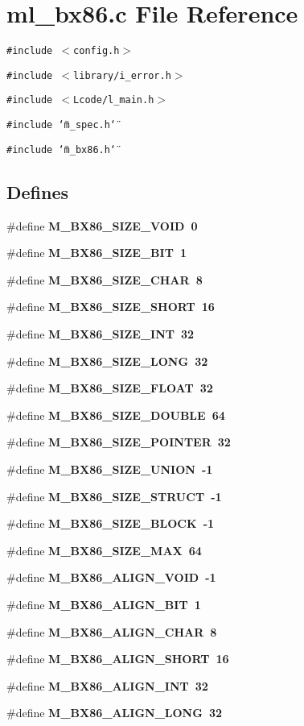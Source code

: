 \section{ml\_\-bx86.c File Reference}
\label{ml__bx86_8c}
{\tt \#include $<$config.h$>$}\par
{\tt \#include $<$library/i\_\-error.h$>$}\par
{\tt \#include $<$Lcode/l\_\-main.h$>$}\par
{\tt \#include \char`\"{}m\_\-spec.h\char`\"{}}\par
{\tt \#include \char`\"{}m\_\-bx86.h\char`\"{}}\par
\subsection*{Defines}
\begin{CompactItemize}
\item 
\#define \bf{M\_\-BX86\_\-SIZE\_\-VOID}~0
\item 
\#define \bf{M\_\-BX86\_\-SIZE\_\-BIT}~1
\item 
\#define \bf{M\_\-BX86\_\-SIZE\_\-CHAR}~8
\item 
\#define \bf{M\_\-BX86\_\-SIZE\_\-SHORT}~16
\item 
\#define \bf{M\_\-BX86\_\-SIZE\_\-INT}~32
\item 
\#define \bf{M\_\-BX86\_\-SIZE\_\-LONG}~32
\item 
\#define \bf{M\_\-BX86\_\-SIZE\_\-FLOAT}~32
\item 
\#define \bf{M\_\-BX86\_\-SIZE\_\-DOUBLE}~64
\item 
\#define \bf{M\_\-BX86\_\-SIZE\_\-POINTER}~32
\item 
\#define \bf{M\_\-BX86\_\-SIZE\_\-UNION}~-1
\item 
\#define \bf{M\_\-BX86\_\-SIZE\_\-STRUCT}~-1
\item 
\#define \bf{M\_\-BX86\_\-SIZE\_\-BLOCK}~-1
\item 
\#define \bf{M\_\-BX86\_\-SIZE\_\-MAX}~64
\item 
\#define \bf{M\_\-BX86\_\-ALIGN\_\-VOID}~-1
\item 
\#define \bf{M\_\-BX86\_\-ALIGN\_\-BIT}~1
\item 
\#define \bf{M\_\-BX86\_\-ALIGN\_\-CHAR}~8
\item 
\#define \bf{M\_\-BX86\_\-ALIGN\_\-SHORT}~16
\item 
\#define \bf{M\_\-BX86\_\-ALIGN\_\-INT}~32
\item 
\#define \bf{M\_\-BX86\_\-ALIGN\_\-LONG}~32

\end{CompactItemize}
